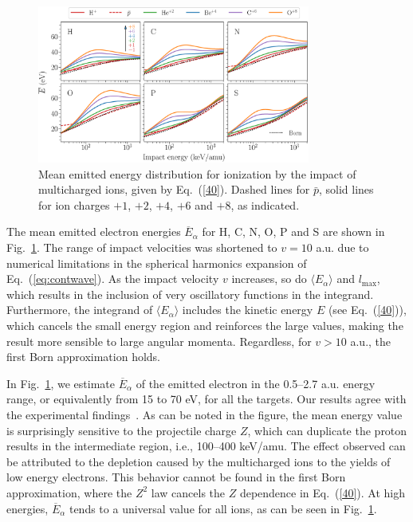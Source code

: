 \documentclass[preprint,showpacs]{revtex4}
\begin{document}
\begin{figure}[t!]
\centering
\includegraphics[width=0.8\textwidth]{figuras/ener_mean.eps}
\caption{Mean emitted energy distribution for ionization by the impact 
of multicharged ions, given by Eq.~(\ref{40}). Dashed lines for $\bar{p}$,
solid lines for ion charges $+1$, $+2$, $+4$, $+6$ and $+8$,
as indicated.}
\label{fig:emittedener}
\end{figure} 

The mean emitted electron energies $\overline{E}_{\alpha}$ for H, C, N, 
O, P and S are shown in Fig.~\ref{fig:emittedener}. The range of impact 
velocities was shortened to $v=10$ a.u. due to numerical limitations 
in the spherical harmonics expansion of Eq.~(\ref{eq:contwave}). 
As the impact velocity $v$ increases, so do $\langle E_{\alpha}\rangle$
and $l_{\max}$, which results in the inclusion of very oscillatory 
functions in the integrand. Furthermore, the integrand of
$\langle E_{\alpha}\rangle$ includes the kinetic energy $E$
(see Eq.~(\ref{40})), which cancels the small energy region and 
reinforces the large values, making the result more sensible to large
angular momenta. Regardless, for $v>10$ a.u., the first Born 
approximation holds.

In Fig.~\ref{fig:emittedener}, we estimate $\overline{E}_{\alpha}$ of
the emitted electron in the 0.5--2.7 a.u. energy range, or equivalently 
from 15 to 70 eV, for all the targets. Our results agree with the 
experimental findings~\cite{surdutovic2018}. As can be noted in the 
figure, the mean energy value is surprisingly sensitive to the 
projectile charge $Z$, which can duplicate the proton results in the 
intermediate region, i.e., 100--400 keV/amu. The effect observed can be 
attributed to the depletion caused by the multicharged ions to the 
yields of low energy electrons. This behavior cannot be found in the 
first Born approximation, where the $Z^2$ law cancels the $Z$ dependence
in Eq.~(\ref{40}). At high energies, $\overline{E}_{\alpha}$ tends to a 
universal value for all ions, as can be seen in Fig.~\ref{fig:emittedener}.
\end{document}
